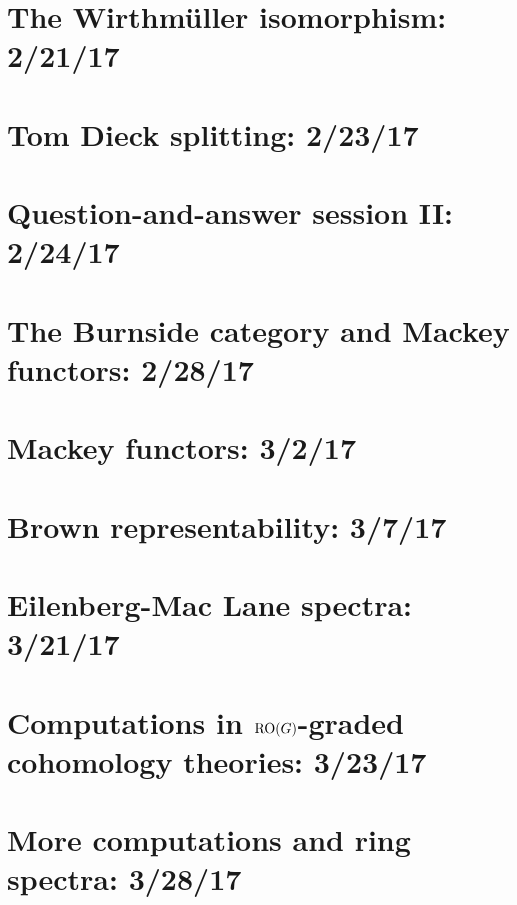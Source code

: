 \documentclass{style_EHT}
\begin{document}
\section{The Wirthmüller isomorphism: 2/21/17}
	
\section{Tom Dieck splitting: 2/23/17}
	
\section{Question-and-answer session II: 2/24/17}
	
\section{The Burnside category and Mackey functors: 2/28/17}
	
\section{Mackey functors: 3/2/17}
	
\section{Brown representability: 3/7/17}
	
\section{Eilenberg-Mac Lane spectra: 3/21/17}
	
\section{Computations in $\mathrm{RO}(G)$-graded cohomology theories: 3/23/17}
	
\section{More computations and ring spectra: 3/28/17}
	

{}

\end{document}
